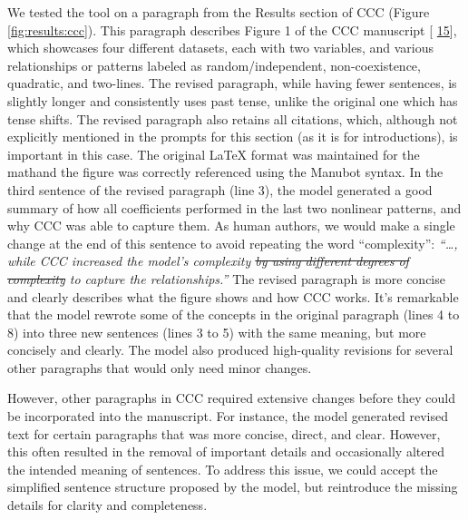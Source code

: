 \documentclass[
]{article}
\providecommand{\DIFaddtex}[1]{{\protect\color{blue}\uwave{#1}}} %
\providecommand{\DIFaddbegin}{} %
\providecommand{\DIFaddend}{} %
\providecommand{\DIFdelbegin}{} %
\providecommand{\DIFdelend}{} %
\providecommand{\DIFadd}[1]{\texorpdfstring{\DIFaddtex{#1}}{#1}} %
\newcommand{\DIFscaledelfig}{0.5}
\newlength{\DIFdelgraphicswidth} %
\newlength{\DIFdelgraphicsheight} %
\newcommand{\DIFaddincludegraphics}[2][]{{\color{blue}\fbox{\DIFOincludegraphics[#1]{#2}}}} %
\newcommand{\DIFdelincludegraphics}[2][]{%
\sbox{\DIFdelgraphicsbox}{\DIFOincludegraphics[#1]{#2}}%
\settoboxwidth{\DIFdelgraphicswidth}{\DIFdelgraphicsbox} %
\settoboxtotalheight{\DIFdelgraphicsheight}{\DIFdelgraphicsbox} %
\scalebox{\DIFscaledelfig}{%
\parbox[b]{\DIFdelgraphicswidth}{\usebox{\DIFdelgraphicsbox}\\[-\baselineskip] \rule{\DIFdelgraphicswidth}{0em}}\llap{\resizebox{\DIFdelgraphicswidth}{\DIFdelgraphicsheight}{%
\setlength{\unitlength}{\DIFdelgraphicswidth}%
\begin{picture}(1,1)%
\thicklines\linethickness{2pt} %
{\color[rgb]{1,0,0}\put(0,0){\framebox(1,1){}}}%
{\color[rgb]{1,0,0}\put(0,0){\line( 1,1){1}}}%
{\color[rgb]{1,0,0}\put(0,1){\line(1,-1){1}}}%
\end{picture}%
}\hspace*{3pt}}} %
} %
\DeclareRobustCommand{\DIFaddbegin}{\DIFOaddbegin \let\includegraphics\DIFaddincludegraphics} %
\DeclareRobustCommand{\DIFaddend}{\DIFOaddend \let\includegraphics\DIFOincludegraphics} %
\DeclareRobustCommand{\DIFdelbegin}{\DIFOdelbegin \let\includegraphics\DIFdelincludegraphics} %
\DeclareRobustCommand{\DIFdelend}{\DIFOaddend \let\includegraphics\DIFOincludegraphics} %
\begin{document}
We tested the tool on a paragraph from the Results section of CCC (Figure \ref{fig:results:ccc}).
This paragraph describes Figure 1 of the CCC manuscript {[}\protect\DIFdelbegin %
\DIFdelend \DIFaddbegin \hyperlink{ref-eirYTTyk}{15}{]}\DIFaddend , which showcases four different datasets, each with two variables, and various relationships or patterns labeled as random/independent, non-coexistence, quadratic, and two-lines.
The revised paragraph, while having fewer sentences, is slightly longer and consistently uses \DIFaddbegin \DIFadd{the }\DIFaddend past tense, unlike the original one which has tense shifts.
The revised paragraph also retains all citations, which, although not explicitly mentioned in the prompts for this section (as it is for introductions), is important in this case.
The original LaTeX format was maintained for the math\DIFaddbegin \DIFadd{, }\DIFaddend and the figure was correctly referenced using the Manubot syntax.
In the third sentence of the revised paragraph (line 3), the model generated a good summary of how all coefficients performed in the last two nonlinear patterns, and why CCC was able to capture them.
As human authors, we would make a single change at the end of this sentence to avoid repeating the word ``complexity'': \emph{``\ldots, while CCC increased the model's complexity \sout{by using different degrees of complexity} to capture the relationships.''}
The revised paragraph is more concise and clearly describes what the figure shows and how CCC works.
It's remarkable that the model rewrote some of the concepts in the original paragraph (lines 4 to 8) into three new sentences (lines 3 to 5) with the same meaning, but more concisely and clearly.
The model also produced high-quality revisions for several other paragraphs that would only need minor changes.

However, other paragraphs in CCC required extensive changes before they could be incorporated into the manuscript.
For instance, the model generated revised text for certain paragraphs that was more concise, direct, and clear.
However, this often resulted in the removal of important details and occasionally altered the intended meaning of sentences.
To address this issue, we could accept the simplified sentence structure proposed by the model, but reintroduce the missing details for clarity and completeness.

% 
\end{document}
